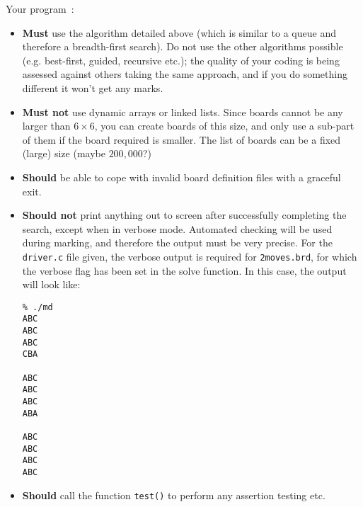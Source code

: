 \begin{exercise}
\noindent
Your program~:
\begin{itemize}
\item {\bf Must} use the algorithm detailed above (which is similar to a queue and therefore a breadth-first search). Do not use the other algorithms possible (e.g. best-first, guided, recursive etc.); the quality of your coding is being assessed against others taking the same approach, and if you do something different it won't get any marks.
\item {\bf Must not} use dynamic arrays or linked lists. Since boards cannot be any larger than $6 \times 6$, you can create boards of this size, and only use a sub-part of them if the board required is smaller. The list of boards can be a fixed (large) size (maybe $200,000$?)
\item {\bf Should} be able to cope with invalid board definition files with a graceful exit.
\item {\bf Should not} print anything out to screen after successfully
completing the search, except when in verbose mode. Automated checking
will be used during marking, and therefore the output must be very precise.
For the \verb^driver.c^ file given, the verbose output is required for
\verb^2moves.brd^, for which the verbose flag has been set in the 
solve function. In this case, the output will look like:
\begin{verbatim}
% ./md
ABC
ABC
ABC
CBA

ABC
ABC
ABC
ABA

ABC
ABC
ABC
ABC

\end{verbatim}

\item {\bf Should} call the function \verb^test()^ to perform any assertion testing etc.
\end{itemize}

\end{exercise}
